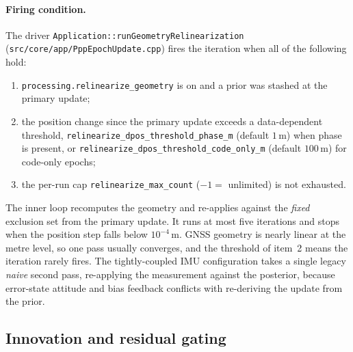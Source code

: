 \documentclass[main.tex]{subfiles}
\begin{document}
\paragraph{Firing condition.}
The driver \texttt{Application::runGeometryRelinearization}
(\texttt{src/core/app/PppEpochUpdate.cpp}) fires the iteration when all of
the following hold:
\begin{enumerate}[leftmargin=*, itemsep=0pt]
\item \texttt{processing.relinearize\_geometry} is on and a prior was
      stashed at the primary update;
\item the position change since the primary update exceeds a
      data-dependent threshold, \texttt{relinearize\_dpos\_threshold\_phase\_m}
      (default $1\,\mathrm{m}$) when phase is present, or
      \texttt{relinearize\_dpos\_threshold\_code\_only\_m} (default
      $100\,\mathrm{m}$) for code-only epochs;
\item the per-run cap \texttt{relinearize\_max\_count}
      ($-1 =$ unlimited) is not exhausted.
\end{enumerate}
The inner loop recomputes the geometry and re-applies
 against the \emph{fixed}
exclusion set from the primary update.  It runs at most five iterations
and stops when the position step falls below $10^{-4}\,\mathrm{m}$.
GNSS geometry is nearly linear at the metre level, so one pass usually
converges, and the threshold of item~2 means the iteration rarely fires.
The tightly-coupled IMU configuration takes a single legacy \emph{naive}
second pass, re-applying the measurement against the posterior, because
error-state attitude and bias feedback conflicts with re-deriving the
update from the prior.

\subsection{Innovation and residual gating}\label{sec:kf-gating}
\end{document}
